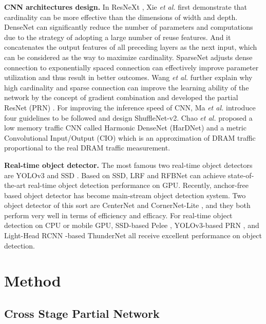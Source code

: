 \documentclass{article}
\begin{document}
{\bf CNN architectures design.} In ResNeXt \cite{xie2017aggregated}, Xie \textit{et al.} first demonstrate that cardinality can be more effective than the dimensions of width and depth.  DenseNet \cite{huang2017densely} can significantly reduce the number of parameters and computations due to the strategy of adopting a large number of reuse features.  And it concatenates the output features of all preceding layers as the next input, which can be considered as the way to maximize cardinality.  SparseNet \cite{zhu2018sparsely} adjusts dense connection to exponentially spaced connection can effectively improve parameter utilization and thus result in better outcomes.  Wang \textit{et al.} further explain why high cardinality and sparse connection can improve the learning ability of the network by the concept of gradient combination and developed the partial ResNet (PRN) \cite{wang2019enriching}.  For improving the inference speed of CNN, Ma \textit{et al.} \cite{ma2018shufflenetv2} introduce four guidelines to be followed and design ShuffleNet-v2.  Chao \textit{et al.} \cite{chao2019hardnet} proposed a low memory traffic CNN called Harmonic DenseNet (HarDNet) and a metric Convolutional Input/Output (CIO) which is an approximation of DRAM traffic proportional to the real DRAM traffic measurement.

{\bf Real-time object detector.} The most famous two real-time object detectors are YOLOv3 \cite{redmon2018yolov3} and SSD \cite{liu2016ssd}.  Based on SSD, LRF \cite{wang2019learning} and RFBNet \cite{liu2018receptive} can achieve state-of-the-art real-time object detection performance on GPU.  Recently, anchor-free based object detector \cite{duan2019centernet, zhou2019objects, law2018cornernet, law2019cornernet, zhang2019freeanchor} has become main-stream object detection system.  Two object detector of this sort are CenterNet \cite{zhou2019objects} and CornerNet-Lite \cite{law2019cornernet}, and they both perform very well in terms of efficiency and efficacy.  For real-time object detection on CPU or mobile GPU, SSD-based Pelee \cite{wang2018pelee}, YOLOv3-based PRN \cite{wang2019enriching}, and Light-Head RCNN \cite{li2017light}-based ThunderNet \cite{qin2019thundernet} all receive excellent performance on object detection.

\section{Method}

\subsection{Cross Stage Partial Network}
\label{subsec:cspnet}
\end{document}

